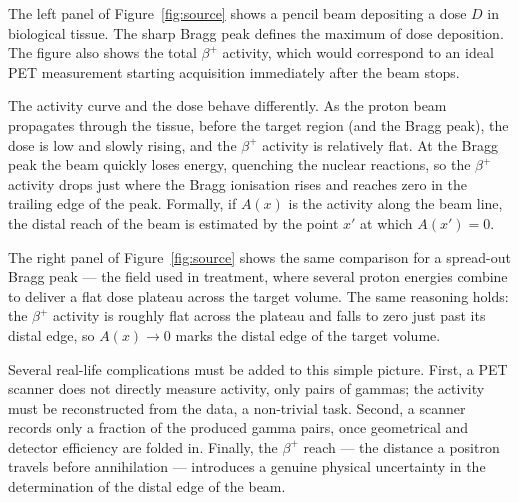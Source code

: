 \documentclass[11pt]{article}
\newcommand{\Ox}[1]{{}^{#1}\mathrm{O}}
\begin{document}

The left panel of Figure~\ref{fig:source} shows a pencil beam depositing a dose $D$ in biological tissue. The sharp Bragg peak defines the maximum of dose deposition. The figure also shows the total $\beta^+$ activity, which would correspond to an ideal PET measurement starting acquisition immediately after the beam stops.

The activity curve and the dose behave differently. As the proton beam propagates through the tissue, before the target region (and the Bragg peak), the dose is low and slowly rising, and the $\beta^+$ activity is relatively flat. At the Bragg peak the beam quickly loses energy, quenching the nuclear reactions, so the $\beta^+$ activity drops just where the Bragg ionisation rises and reaches zero in the trailing edge of the peak. Formally, if $A(x)$ is the activity along the beam line, the distal reach of the beam is estimated by the point $x'$ at which $A(x')=0$.

The right panel of Figure~\ref{fig:source} shows the same comparison for a spread-out Bragg peak --- the field used in treatment, where several proton energies combine to deliver a flat dose plateau across the target volume. The same reasoning holds: the $\beta^+$ activity is roughly flat across the plateau and falls to zero just past its distal edge, so $A(x) \rightarrow 0$ marks the distal edge of the target volume.

Several real-life complications must be added to this simple picture. First, a PET scanner does not directly measure activity, only pairs of gammas; the activity must be reconstructed from the data, a non-trivial task. Second, a scanner records only a fraction of the produced gamma pairs, once geometrical and detector efficiency are folded in. Finally, the $\beta^+$ reach --- the distance a positron travels before annihilation --- introduces a genuine physical uncertainty in the determination of the distal edge of the beam.
\end{document}
